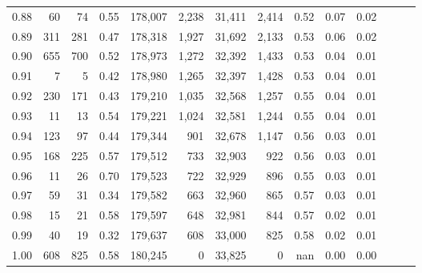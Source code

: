 \begin{tabular}{rrrrrrrrrrrrrr}
0.88 &      60 &     74 &  0.55 &  178,007 &    2,238 &  31,411 &   2,414 &  0.52 &  0.07 &      0.02 \\
0.89 &     311 &    281 &  0.47 &  178,318 &    1,927 &  31,692 &   2,133 &  0.53 &  0.06 &      0.02 \\
0.90 &     655 &    700 &  0.52 &  178,973 &    1,272 &  32,392 &   1,433 &  0.53 &  0.04 &      0.01 \\
0.91 &       7 &      5 &  0.42 &  178,980 &    1,265 &  32,397 &   1,428 &  0.53 &  0.04 &      0.01 \\
0.92 &     230 &    171 &  0.43 &  179,210 &    1,035 &  32,568 &   1,257 &  0.55 &  0.04 &      0.01 \\
0.93 &      11 &     13 &  0.54 &  179,221 &    1,024 &  32,581 &   1,244 &  0.55 &  0.04 &      0.01 \\
0.94 &     123 &     97 &  0.44 &  179,344 &      901 &  32,678 &   1,147 &  0.56 &  0.03 &      0.01 \\
0.95 &     168 &    225 &  0.57 &  179,512 &      733 &  32,903 &     922 &  0.56 &  0.03 &      0.01 \\
0.96 &      11 &     26 &  0.70 &  179,523 &      722 &  32,929 &     896 &  0.55 &  0.03 &      0.01 \\
0.97 &      59 &     31 &  0.34 &  179,582 &      663 &  32,960 &     865 &  0.57 &  0.03 &      0.01 \\
0.98 &      15 &     21 &  0.58 &  179,597 &      648 &  32,981 &     844 &  0.57 &  0.02 &      0.01 \\
0.99 &      40 &     19 &  0.32 &  179,637 &      608 &  33,000 &     825 &  0.58 &  0.02 &      0.01 \\
1.00 &     608 &    825 &  0.58 &  180,245 &        0 &  33,825 &       0 &   nan &  0.00 &      0.00 \\
\bottomrule
\end{tabular}
